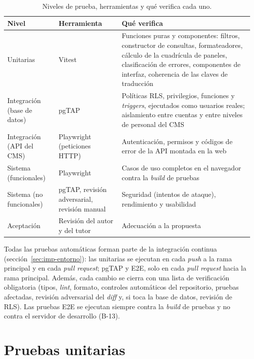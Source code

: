 \begin{table}[htbp]
  \centering
  \footnotesize
  \caption{Niveles de prueba, herramientas y qué verifica cada uno.}
  \label{tab:pru-niveles}
  \begin{tabularx}{\textwidth}{@{}>{\raggedright\arraybackslash}p{2.6cm}>{\raggedright\arraybackslash}p{2.4cm}X@{}}
    \toprule
    \textbf{Nivel} & \textbf{Herramienta} & \textbf{Qué verifica} \\
    \midrule
    Unitarias & Vitest & Funciones puras y componentes: filtros, constructor de consultas, formateadores, cálculo de la cuadrícula de paneles, clasificación de errores, componentes de interfaz, coherencia de las claves de traducción \\
    Integración (base de datos) & pgTAP~\cite{pgtap} & Políticas RLS, privilegios, funciones y \textit{triggers}, ejecutados como usuarios reales; aislamiento entre cuentas y entre niveles de personal del CMS \\
    Integración (API del CMS) & Playwright (peticiones HTTP) & Autenticación, permisos y códigos de error de la API montada en la web \\
    Sistema (funcionales) & Playwright~\cite{playwright} & Casos de uso completos en el navegador contra la \textit{build} de pruebas \\
    Sistema (no funcionales) & pgTAP, revisión adversarial, revisión manual & Seguridad (intentos de ataque), rendimiento y usabilidad \\
    Aceptación & Revisión del autor y del tutor & Adecuación a la propuesta \\
    \bottomrule
  \end{tabularx}
\end{table}

Todas las pruebas automáticas forman parte de la integración continua
(sección~\ref{sec:imp-entorno}): las unitarias se ejecutan en cada
\textit{push} a la rama principal y en cada \textit{pull request}; pgTAP y E2E, solo en cada \textit{pull request} hacia la rama
principal. Además, cada cambio se cierra con una lista de verificación
obligatoria (tipos, \textit{lint}, formato, controles automáticos del repositorio, pruebas
afectadas, revisión adversarial del \textit{diff} y, si toca la base de
datos, revisión de RLS). Las pruebas E2E se ejecutan siempre contra la
\textit{build} de pruebas y no contra el servidor de desarrollo (B-13).

\section{Pruebas unitarias}
\label{sec:pru-unitarias}

